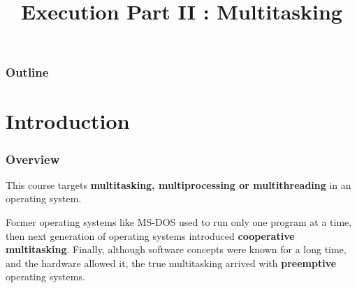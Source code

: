 %
%
%
%
%
%

%
%

%
%

\def\path{../../../..}

%
%



%
%

\title{Execution Part II : Multitasking}

%
%



%
%

\begin{frame}
  \titlepage
\end{frame}

%
%

\begin{frame}
  \frametitle{Outline}

  \tableofcontents
\end{frame}

%
%



%
%

%
%

\section{Introduction}


\begin{frame}
  \frametitle{Overview}

  This course targets \textbf{multitasking, multiprocessing or multithreading} in an operating system.

  \-

Former operating systems like MS-DOS used to run only one program at a time, then next generation of operating systems introduced \textbf{cooperative multitasking}. Finally, although software concepts were known for a long time, and the hardware allowed it, the true multitasking arrived with \textbf{preemptive} operating systems.    
 
\end{frame}

